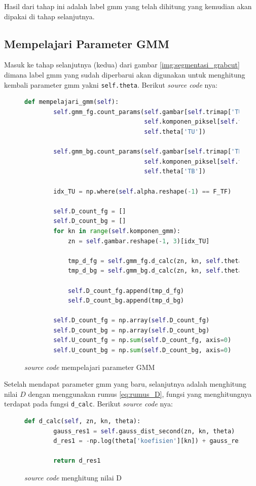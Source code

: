 Hasil dari tahap ini adalah label gmm yang telah dihitung yang kemudian akan dipakai 
di tahap selanjutnya.


\subsection{Mempelajari Parameter GMM}
Masuk ke tahap selanjutnya (kedua) dari gambar \ref{img:segmentasi_grabcut} dimana 
label gmm yang sudah diperbarui akan digunakan untuk menghitung kembali parameter 
gmm yakni \texttt{self.theta}. Berikut \emph{source code} nya:

\begin{figure}[H]
	\begin{lstlisting}[language=Python, basicstyle=\tiny]
	def mempelajari_gmm(self):
        self.gmm_fg.count_params(self.gambar[self.trimap['TU']], 
                                 self.komponen_piksel[self.trimap['TU']], 
                                 self.theta['TU'])

        self.gmm_bg.count_params(self.gambar[self.trimap['TB']], 
                                 self.komponen_piksel[self.trimap['TB']], 
                                 self.theta['TB'])

        idx_TU = np.where(self.alpha.reshape(-1) == F_TF)

		self.D_count_fg = []
        self.D_count_bg = []
        for kn in range(self.komponen_gmm):
            zn = self.gambar.reshape(-1, 3)[idx_TU]

            tmp_d_fg = self.gmm_fg.d_calc(zn, kn, self.theta['TU'])
            tmp_d_bg = self.gmm_bg.d_calc(zn, kn, self.theta['TB'])

            self.D_count_fg.append(tmp_d_fg)
            self.D_count_bg.append(tmp_d_bg)

        self.D_count_fg = np.array(self.D_count_fg)
        self.D_count_bg = np.array(self.D_count_bg)
        self.U_count_fg = np.sum(self.D_count_fg, axis=0)
        self.U_count_bg = np.sum(self.D_count_bg, axis=0)       
	\end{lstlisting}
	\caption{\emph{source code} mempelajari parameter GMM}
	\label{code:learn_gmm}
\end{figure}

Setelah mendapat parameter gmm yang baru, selanjutnya adalah menghitung nilai \(D\)
dengan menggunakan rumus \ref{eq:rumus_D}, fungsi yang menghitungnya terdapat pada 
fungsi \texttt{d\_calc}. Berikut \emph{source code} nya:

\begin{figure}[H]
	\begin{lstlisting}[language=Python, basicstyle=\tiny]
	def d_calc(self, zn, kn, theta):
        gauss_res1 = self.gauss_dist_second(zn, kn, theta)
        d_res1 = -np.log(theta['koefisien'][kn]) + gauss_res1

        return d_res1
	\end{lstlisting}
	\caption{\emph{source code} menghitung nilai D}
	\label{code:count_d}
\end{figure}

